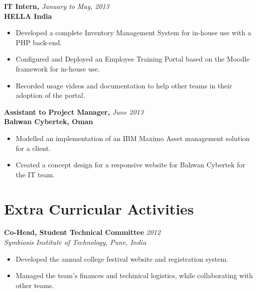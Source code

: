 \documentclass[overlapped]{res}
\begin{document}
\begin{resume}
  \textbf{IT Intern,} \hfill \textit{January to May, 2013}\\
  \textbf{HELLA India}
  \begin{itemize}
  \item Developed a complete Inventory Management System for in-house use with
    a PHP back-end. 
  \item Configured and Deployed an Employee Training Portal based on the
    Moodle framework for in-house use.
  \item Recorded usage videos and documentation to help other teams in their
    adoption of the portal.
  \end{itemize}
  
  \textbf{Assistant to Project Manager,}  \hfill \textit{June 2013}\\
  \textbf{Bahwan Cybertek, Oman}
  \begin{itemize}
  \item Modelled an implementation of an IBM Maximo Asset management 
    solution for a client. 
  \item Created a concept design for a responsive website for Bahwan Cybertek 
    for the IT team. 
  \end{itemize}

  \section{Extra Curricular Activities}  

  \textbf{Co-Head, Student Technical Committee}   \hfill \textit{2012} \\
  \textit{Symbiosis Institute of Technology, Pune, India}
  \begin{itemize}
  \item Developed the annual college festival website and registration system.
  \item Managed the team's finances and techinical logistics, while collaborating 
    with other teams.
  \end{itemize}


\end{resume}
\end{document}
